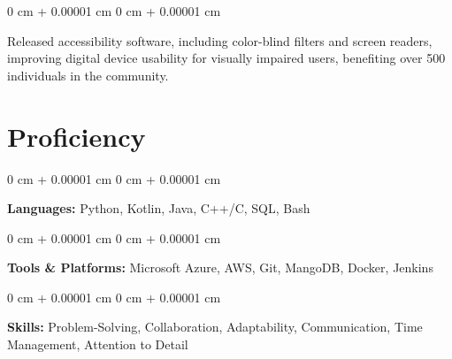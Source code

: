 \documentclass[10pt, letterpaper]{article}
\newenvironment{highlights}{
    \begin{itemize}[
        topsep=0.10 cm,
        parsep=0.10 cm,
        partopsep=0pt,
        itemsep=0pt,
        leftmargin=0 cm + 10pt
    ]
}{
    \end{itemize}
} %
\newenvironment{onecolentry}{
    \begin{adjustwidth}{
        0 cm + 0.00001 cm
    }{
        0 cm + 0.00001 cm
    }
}{
    \end{adjustwidth}
} %
\begin{document}
        \vspace{0.10 cm}
        \begin{onecolentry}
            \begin{highlights}
                 Released accessibility software, including color-blind filters and screen readers, improving digital device usability for visually impaired users, benefiting over 500 individuals in the community.
            \end{highlights}
        \end{onecolentry}



    
    \section{Proficiency}



        
        \begin{onecolentry}
            \textbf{Languages:} Python, Kotlin, Java, C++/C, SQL, Bash
        \end{onecolentry}

        \vspace{0.2 cm}

        \begin{onecolentry}
            \textbf{Tools \& Platforms:} Microsoft Azure, AWS, Git, MangoDB, Docker, Jenkins
        \end{onecolentry}

         \vspace{0.2 cm}

        \begin{onecolentry}
            \textbf{Skills:} Problem-Solving, Collaboration, Adaptability, Communication, Time Management, Attention to Detail
        \end{onecolentry}
    
\end{document}
